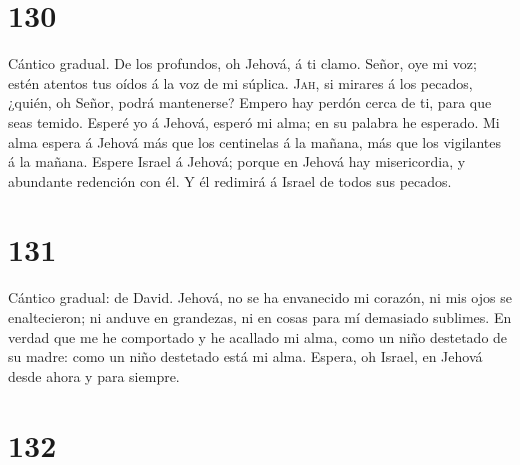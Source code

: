 \hypertarget{section-129}{%
\section{130}\label{section-129}}

 Cántico gradual. De los profundos, oh Jehová, á ti clamo.
 Señor, oye mi voz; estén atentos tus oídos á la voz de mi
súplica.  \textsc{Jah}, si mirares á los pecados, ¿quién,
oh Señor, podrá mantenerse?  Empero hay perdón cerca de
ti, para que seas temido.  Esperé yo á Jehová, esperó mi
alma; en su palabra he esperado.  Mi alma espera á Jehová
más que los centinelas á la mañana, más que los vigilantes á la mañana.
 Espere Israel á Jehová; porque en Jehová hay
misericordia, y abundante redención con él.  Y él redimirá
á Israel de todos sus pecados.

\hypertarget{section-130}{%
\section{131}\label{section-130}}

 Cántico gradual: de David. Jehová, no se ha envanecido mi
corazón, ni mis ojos se enaltecieron; ni anduve en grandezas, ni en
cosas para mí demasiado sublimes.  En verdad que me he
comportado y he acallado mi alma, como un niño destetado de su madre:
como un niño destetado está mi alma.  Espera, oh Israel,
en Jehová desde ahora y para siempre.

\hypertarget{section-131}{%
\section{132}\label{section-131}}

